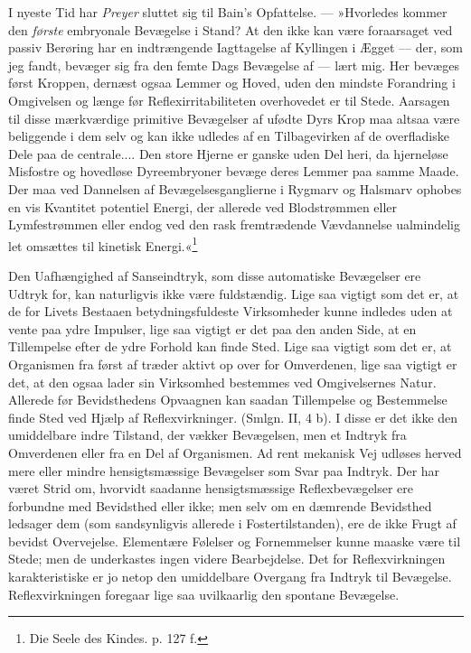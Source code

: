 \documentclass[12pt,a4paper,openany]{book}
\newcommand{\opage}[1]{\marginnote{\footnotesize\textit{[#1]}}}
\begin{document}
I nyeste Tid har \emph{Preyer} sluttet sig til Bain’s Opfattelse. ---
»Hvorledes kommer den \emph{første} embryonale Bevægelse i Stand? At den
ikke kan være foraarsaget ved passiv Berøring har en indtrængende
Iagttagelse af Kyllingen i Ægget --- der, som jeg fandt, bevæger sig fra
den femte Dags Bevægelse af --- lært mig. Her bevæges først Kroppen,
dernæst ogsaa Lemmer og Hoved, uden den mindste Forandring i Omgivelsen
og længe før Reflexirritabiliteten overhovedet er til Stede. Aarsagen
til disse mærkværdige primitive Bevægelser af ufødte Dyrs Krop maa
altsaa være beliggende i dem selv og kan ikke udledes af en
Tilbagevirken af de overfladiske Dele paa de centrale.... Den store
Hjerne er ganske uden Del heri, da hjerneløse Misfostre og hovedløse
Dyreembryoner bevæge deres Lemmer paa samme Maade. Der maa ved Dannelsen
af Bevægelsesganglierne i Rygmarv og Halsmarv ophobes en vis Kvantitet
potentiel Energi, der allerede ved Blodstrømmen eller Lymfestrømmen
eller endog ved den rask fremtrædende Vævdannelse ualmindelig let
omsættes til kinetisk Energi.«\footnote[1]{Die Seele des Kindes. p. 127
f.}

Den Uafhængighed af Sanseindtryk, som disse automatiske Bevægelser ere
Udtryk for, kan naturligvis ikke være fuldstændig. Lige saa vigtigt som
det er, at de for Livets Bestaaen betydningsfuldeste Virksomheder kunne
indledes uden at vente paa ydre Impulser, lige saa vigtigt er det paa
den anden Side, at en Tillempelse efter de ydre Forhold kan finde Sted.
Lige saa vigtigt som det er, at Organismen fra først af træder aktivt op
over for Omverdenen, lige saa vigtigt er det, at den ogsaa lader sin
Virksomhed bestemmes ved
\opage{369}Omgivelsernes Natur. Allerede før Bevidsthedens Opvaagnen kan
saadan Tillempelse og Bestemmelse finde Sted ved Hjælp af
Reflexvirkninger. (Smlgn. II, 4 b). I disse er det ikke den umiddelbare
indre Tilstand, der vækker Bevægelsen, men et Indtryk fra Omverdenen
eller fra en Del af Organismen. Ad rent mekanisk Vej udløses herved mere
eller mindre hensigtsmæssige Bevægelser som Svar paa Indtryk. Der har
været Strid om, hvorvidt saadanne hensigtsmæssige Reflexbevægelser ere
forbundne med Bevidsthed eller ikke; men selv om en dæmrende Bevidsthed
ledsager dem (som sandsynligvis allerede i Fostertilstanden), ere de
ikke Frugt af bevidst Overvejelse. Elementære Følelser og Fornemmelser
kunne maaske være til Stede; men de underkastes ingen videre
Bearbejdelse. Det for Reflexvirkningen karakteristiske er jo netop den
umiddelbare Overgang fra Indtryk til Bevægelse. Reflexvirkningen
foregaar lige saa uvilkaarlig den spontane Bevægelse.
\end{document}
